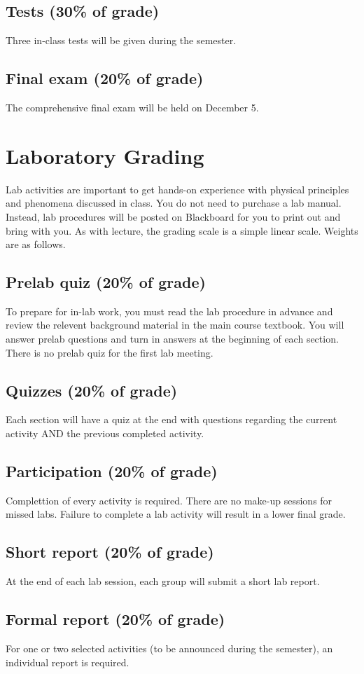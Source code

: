 \documentclass{report}
\begin{document}
\subsection*{Tests (30\% of grade)}
Three in-class tests will be given during the semester.

\subsection*{Final exam (20\% of grade)}
The comprehensive final exam will be held on December 5.

\newpage{}

\section*{Laboratory Grading}
Lab activities are important to get hands-on experience with physical principles
and phenomena discussed in class. You do not need to purchase a lab manual. Instead,
lab procedures will be posted on Blackboard for you to print out and bring with you.
As with lecture, the grading scale is a simple linear scale. Weights are as follows.

\subsection*{Prelab quiz (20\% of grade)}
To prepare for in-lab work, you must read the lab procedure in advance and
review the relevent background material in the main course textbook. You
will answer prelab questions and turn in answers at the beginning of each
section. There is no prelab quiz for the first lab meeting.

\subsection*{Quizzes (20\% of grade)}
Each section will have a quiz at the end with questions regarding the current
activity AND the previous completed activity.

\subsection*{Participation (20\% of grade)}
Complettion of every activity is required. There are no make-up sessions for
missed labs. Failure to complete a lab activity will result in a lower final 
grade.

\subsection*{Short report (20\% of grade)}
At the end of each lab session, each group will submit a short lab report.

\subsection*{Formal report (20\% of grade)}
For one or two selected activities (to be announced during the semester), an individual
report is required.
\end{document}
